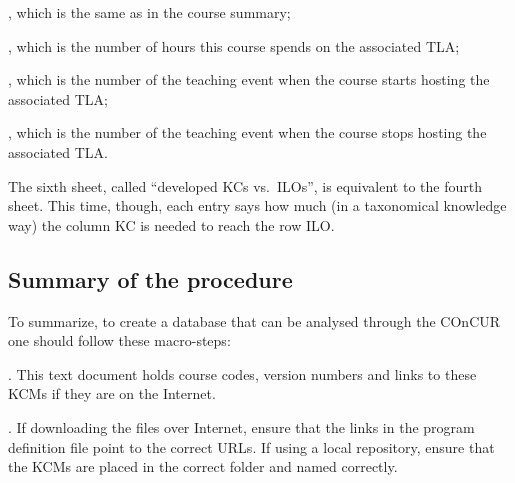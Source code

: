 \begin{itemize}

	, which is the same as in the course summary;
	
	, which is the number of hours
		this course spends on the associated \ac{TLA};
	
	, which is the number of the
		teaching event when the course starts hosting the associated
		\ac{TLA};
	
	, which is the number of the
		teaching event when the course stops hosting the associated
		\ac{TLA}.

\end{itemize}

The sixth sheet, called ``developed KCs vs.\ ILOs'', is equivalent to the
fourth sheet. This time, though, each entry says how much (in a taxonomical
knowledge way) the column \ac{KC} is needed to reach the row \ac{ILO}.

\subsection{Summary of the procedure}

To summarize, to create a database that can be analysed through the COnCUR
one should follow these macro-steps:

\begin{enumerate}

	. This text document
		holds course codes, version numbers and links to these
		\acp{KCM} if they are on the Internet.
	
	. If
		downloading the files over Internet, ensure that the links
		in the program definition file point to the correct URLs. If
		using a local repository, ensure that the \acp{KCM} are
		placed in the correct folder and named correctly.

\end{enumerate}

